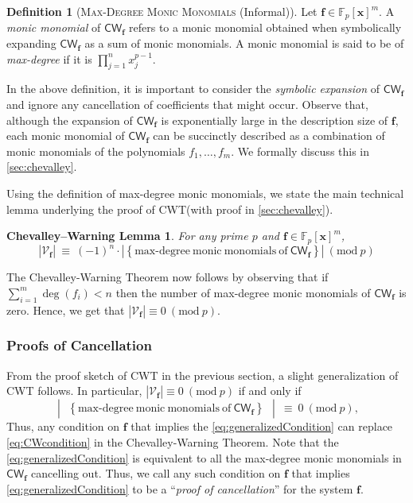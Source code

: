 \documentclass[10pt,a4paper]{article}
\theoremstyle{definition}
\newtheorem{definition}[theorem]{Definition}
\theoremstyle{remark}
\newcommand{\inparen}[1]{\left ( #1 \right )}
\newcommand{\inabs}[1]{\begin{vmatrix} #1 \end{vmatrix}}
\renewcommand{\mod}[1]{~\inparen{\mathrm{mod}~#1}}
\def\set#1{\left\{#1\right\}}
\newcommand{\bbF}{\ensuremath{\mathbb{F}}}
\newcommand{\calV}{\mathcal{V}}
\newcommand{\vecf}{\ensuremath{\boldsymbol{f}}}
\newcommand{\vecx}{\ensuremath{\boldsymbol{x}}}
\newcommand{\CWT}{CWT\xspace}
\newcommand{\CW}{\mathsf{CW}}
\begin{document}
\begin{definition}[\textsc{Max-Degree Monic Monomials} (Informal)]
	\label{def:max-degreeMonomialInformal}
    Let $\vecf \in \bbF_p[\vecx]^m$.
    			A \textit{monic monomial} of $\CW_{\vecf}$ refers to a monic monomial obtained when symbolically expanding $\CW_{\vecf}$ as a sum of monic monomials. A monic monomial is said to be of \textit{max-degree} if it is
	$\prod_{j = 1}^n x_j^{p - 1}$.

\end{definition}

   In the above definition, it is important to consider the
\emph{symbolic expansion} of $\CW_{\vecf}$ and ignore any cancellation of coefficients that might occur. Observe that, although the
expansion of $\CW_{\vecf}$ is exponentially large in the description size of
$\vecf$, each monic monomial of $\CW_{\vecf}$ can be succinctly described as a combination of monic monomials of the polynomials $f_1, \ldots, f_m$. We formally
discuss this in \autoref{sec:chevalley}.

Using the definition of max-degree monic monomials, we state the main technical
lemma underlying the proof of \CWT (with proof in \autoref{sec:chevalley}).
\theoremstyle{plain}
\newtheorem*{cwthmprinciple}{Chevalley--Warning Lemma}
\begin{cwthmprinciple}
For any prime $p$ and $\vecf \in \bbF_p[\vecx]^m$,
\begin{equation}
	\tag{CW Lemma}
	|\calV_{\vecf}| ~\equiv~ (-1)^n \cdot  |\set{\mathrm{max\text{-}degree~monic~monomials~of~} \CW_{\vecf}}| \mod{p}
	\label{eq:mainPrinciple}
\end{equation}
\end{cwthmprinciple}

\noindent The Chevalley-Warning Theorem now follows by observing that if $\sum_{i = 1}^m \deg(f_i) < n$ then the number of max-degree monic monomials of $\CW_{\vecf}$ is zero. Hence, we get that $|\calV_{\vecf}| \equiv 0 \mod{p}$.

\subsubsection{Proofs of Cancellation}
\label{sec:proofsOfCancellation}

  From the proof sketch of CWT in the previous section, a slight generalization of CWT follows. In particular, $|\calV_{\vecf}| \equiv 0 \mod{p}$ if and only if
\begin{equation}
	\tag{Extended CW Condition}
	\inabs{\set{\mathrm{max\text{-}degree~monic~monomials~of~} \CW_{\vecf}}} ~\equiv~ 0 \mod{p},
		\label{eq:generalizedCondition}
\end{equation}
Thus, any condition on $\vecf$ that implies the \eqref{eq:generalizedCondition} can
 replace \eqref{eq:CWcondition} in the Chevalley-Warning
Theorem. Note that the \eqref{eq:generalizedCondition} is equivalent to all the max-degree monic monomials in $\CW_{\vecf}$ cancelling out.
Thus, we call any such condition on $\vecf$ that implies \eqref{eq:generalizedCondition} to be a
``\textit{proof of cancellation}'' for the system $\vecf$.
\end{document}
